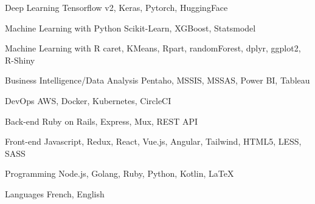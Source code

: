 

\begin{cvskills}

  \cvskill
    {Deep Learning} %
    {Tensorflow v2, Keras, Pytorch, HuggingFace} %

  \cvskill
    {Machine Learning with Python} %
    {Scikit-Learn, XGBoost, Statsmodel} %

  \cvskill
    {Machine Learning with R} %
    {caret, KMeans, Rpart, randomForest, dplyr, ggplot2, R-Shiny} %

  \cvskill
    {Business Intelligence/Data Analysis} %
    {Pentaho, MSSIS, MSSAS, Power BI, Tableau} %

  \cvskill
    {DevOps} %
    {AWS, Docker, Kubernetes, CircleCI} %

  \cvskill
    {Back-end} %
    {Ruby on Rails, Express, Mux, REST API} %

  \cvskill
    {Front-end} %
    {Javascript, Redux, React, Vue.js, Angular, Tailwind, HTML5, LESS, SASS} %

  \cvskill
    {Programming} %
    {Node.js, Golang, Ruby, Python, Kotlin, LaTeX} %

  \cvskill
    {Languages} %
    {French, English} %

\end{cvskills}
